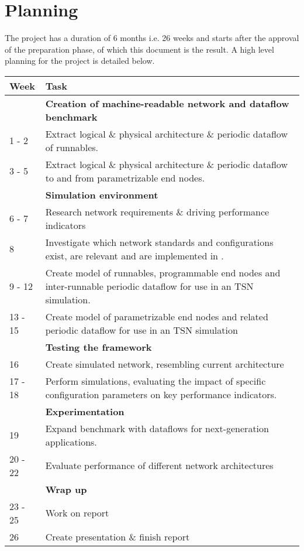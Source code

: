 \section{Planning}
\label{sec:planning}
The project has a duration of 6 months i.e. 26 weeks and starts after the approval of the preparation phase, of which this document is the result. A high level planning for the project is detailed below.

\begin{table}[htb]
	\centering
	\begin{tabularx}{\textwidth}{@{}lX@{}}
		\toprule
		\textbf{Week} 	& \textbf{Task} \\ \midrule
						& \textbf{Creation of machine-readable network and dataflow benchmark} \\
		1 - 2			& Extract logical \& physical architecture \& periodic dataflow of runnables.  \\
		3 - 5			& Extract logical \& physical architecture \& periodic dataflow to and from parametrizable end nodes.\\\midrule
						& \textbf{Simulation environment} \\
		6 - 7			& Research network requirements \& driving performance indicators \\
		8 				& Investigate which network standards and configurations exist, are relevant and are implemented in \omnet. \\
		9 - 12			& Create model of runnables, programmable end nodes and inter-runnable periodic dataflow for use in an \omnet TSN simulation.\\
		13 - 15 		& Create model of parametrizable end nodes and related periodic dataflow for use in an \omnet TSN simulation \\ \midrule
						& \textbf{Testing the framework} \\
		16				& Create simulated network, resembling current architecture\\
		17 - 18			& Perform simulations, evaluating the impact of specific configuration parameters on key performance indicators. \\ \midrule
						& \textbf{Experimentation} \\
		19				& Expand benchmark with dataflows for next-generation applications.\\
		20 - 22			& Evaluate performance of different network architectures \\\midrule
						& \textbf{Wrap up} \\
		23 - 25			& Work on report  \\
		26				& Create presentation \& finish report\\
		\bottomrule
	\end{tabularx}
\end{table}